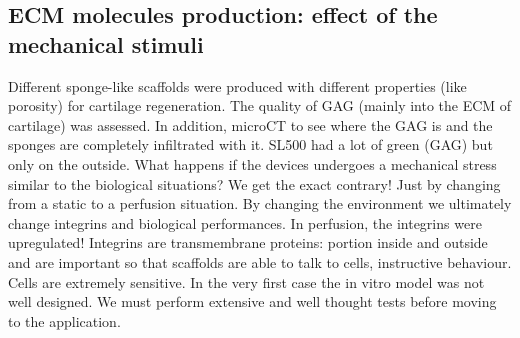 	\subsection{ECM molecules production: effect of the mechanical stimuli}
	Different sponge-like scaffolds were produced with different properties (like porosity) for cartilage regeneration.
	The quality of GAG (mainly into the ECM of cartilage) was assessed.
	In addition, microCT to see where the GAG is and the sponges are completely infiltrated with it.
	SL500 had a lot of green (GAG) but only on the outside.
	What happens if the devices undergoes a mechanical stress similar to the biological situations? We get the exact contrary! Just by changing from a static to a perfusion situation.
	By changing the environment we ultimately change integrins and biological performances.
	In perfusion, the integrins were upregulated! Integrins are transmembrane proteins: portion inside and outside and are important so that scaffolds are able to talk to cells, instructive behaviour.
	Cells are extremely sensitive.
	In the very first case the in vitro model was not well designed.
	We must perform extensive and well thought tests before moving to the application.
